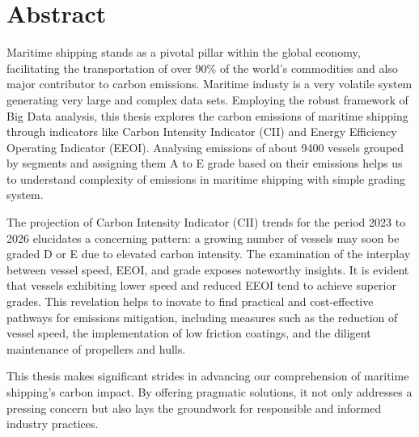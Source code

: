 \chapter*{Abstract}
\setlength{\parskip}{1em}

Maritime shipping stands as a pivotal pillar within the global economy, 
facilitating the transportation of over 90\% of the world's commodities and also major contributor to carbon emissions.
Maritime industy is a very volatile system  generating very large and complex data sets.
Employing the robust framework of Big Data analysis, this thesis explores the carbon emissions of maritime shipping through indicators like Carbon Intensity Indicator (CII) and Energy Efficiency Operating Indicator (EEOI).
Analysing emissions of about 9400 vessels grouped by segments and assigning them A to E grade based on their emissions helps us to understand complexity of emissions in maritime shipping with simple grading system.


The projection of Carbon Intensity Indicator (CII) trends for the period 2023 to 2026 elucidates a concerning pattern: a growing number of vessels may soon be graded D or E due to elevated carbon intensity.
The examination of the interplay between vessel speed, EEOI, and grade exposes noteworthy insights. It is evident that vessels exhibiting lower speed and reduced EEOI tend to achieve superior grades.
This revelation helps to inovate to find practical and cost-effective pathways for emissions mitigation, 
including measures such as the reduction of vessel speed, the implementation of low friction coatings, and the diligent maintenance of propellers and hulls.


This thesis makes significant strides in advancing our comprehension of maritime shipping's carbon impact. 
By offering pragmatic solutions, it not only addresses a pressing concern but also lays the groundwork for responsible and informed industry practices.